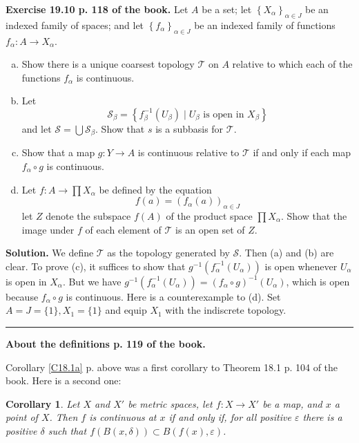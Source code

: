 \documentclass[12pt,letterpaper]{article}
\newtheorem{cor}[thm]{Corollary}
\newcommand{\eps}{\varepsilon}
\newcommand{\mc}{\mathcal}
\newcommand{\noi}{\noindent}%
\newcommand{\T}{\mathcal T}
\begin{document}
\noi\textbf{Exercise 19.10 p. 118 of the book.} Let $A$ be a set; let $\left\{X_{\alpha}\right\}_{\alpha \in J}$ be an indexed family of spaces; and let $\left\{f_{\alpha}\right\}_{\alpha \in J}$ be an indexed family of functions $f_{\alpha}: A \rightarrow X_{\alpha}$.
    \begin{enumerate}[(a)]
        \item Show there is a unique coarsest topology $\mathcal{T}$ on $A$ relative to which each of the functions $f_\alpha$ is continuous.
        \item Let
        \[
        \mc S_\beta= \left\{f_{\beta}^{-1}\left(U_{\beta}\right)\mid U_{\beta}\text{ is open in } X_\beta\right\}
        \]
        and let $\mc S=\bigcup\mc S_\beta$. Show that $s$ is a subbasis for $\mathcal{T}$.
        \item Show that a map $g:Y\rightarrow A$ is continuous relative to $\mathcal{T}$ if and only if each map $f_\alpha\circ g$ is continuous.
        \item Let $f:A\rightarrow\prod X_\alpha$ be defined by the equation
        \[
        f(a) = \left(f_\alpha(a)\right)_{\alpha \in J}
        \]
        let $Z$ denote the subspace $f(A)$ of the product space $\prod X_\alpha$. Show that the image under $f$ of each element of $\mathcal{T}$ is an open set of $Z$.
    \end{enumerate} 

\noi\textbf{Solution.} We define $\T$ as the topology generated by $\mc S$. Then (a) and (b) are clear. To prove (c), it suffices to show that $g^{-1}(f_\alpha^{-1}(U_\alpha))$ is open whenever $U_\alpha$ is open in $X_\alpha$. But we have $g^{-1}(f_\alpha^{-1}(U_\alpha))=(f_\alpha\circ g)^{-1}(U_\alpha)$, which is open because $f_\alpha\circ g$ is continuous. Here is a counterexample to (d). Set $A=J=\{1\},X_1=\{1\}$ and equip $X_1$ with the indiscrete topology. 

\bigskip\hrule\medskip 

\noi\textbf{About the definitions p. 119 of the book.} 

\noi Corollary \ref{C18.1a} p. \pageref{C18.1a} above was a first corollary to Theorem 18.1 p. 104 of the book. Here is a second one: 

\begin{cor}\label{C18.1b}
Let $X$ and $X'$ be metric spaces, let $f:X\to X'$ be a map, and $x$ a point of $X$. Then $f$ is continuous at $x$ if and only if, for all positive $\eps$ there is a positive $\delta$ such that $f(B(x,\delta))\subset B(f(x),\eps)$. 
\end{cor} 
\end{document}

